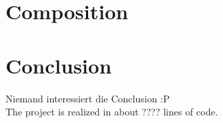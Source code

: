\documentclass[colorback,accentcolor=tud1c,11pt]{tudreport}
\begin{document}




\chapter{Composition}




\chapter{Conclusion}
Niemand interessiert die Conclusion   :P
\\
The project is realized in about ???? lines of code.





\end{document}
